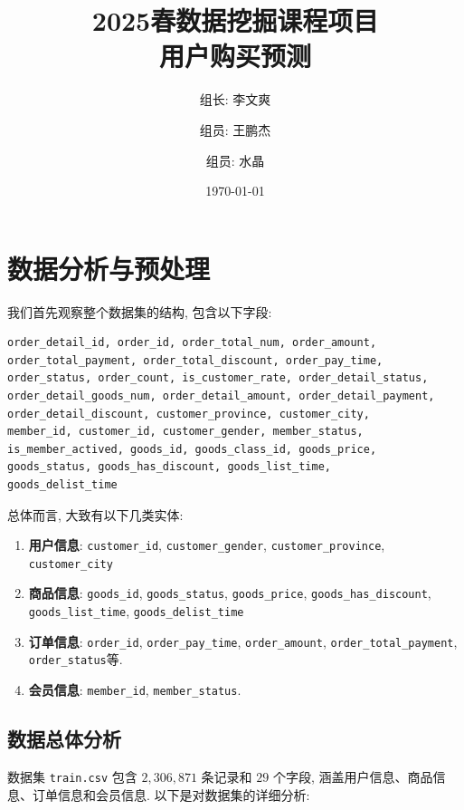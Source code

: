 \documentclass[11pt, a4paper]{article}
\title{2025春数据挖掘课程项目 \\ 用户购买预测}
\author{组长: 李文爽 \and 组员: 王鹏杰 \and 组员: 水晶}
\date{\today}
\begin{document}
\maketitle
\thispagestyle{empty}
\newpage
\tableofcontents
\newpage

\section{数据分析与预处理}

我们首先观察整个数据集的结构, 包含以下字段:
\begin{lstlisting}[language=bash]
order_detail_id, order_id, order_total_num, order_amount, 
order_total_payment, order_total_discount, order_pay_time, 
order_status, order_count, is_customer_rate, order_detail_status, 
order_detail_goods_num, order_detail_amount, order_detail_payment, 
order_detail_discount, customer_province, customer_city, 
member_id, customer_id, customer_gender, member_status, 
is_member_actived, goods_id, goods_class_id, goods_price, 
goods_status, goods_has_discount, goods_list_time, 
goods_delist_time
\end{lstlisting}

总体而言, 大致有以下几类实体:
\begin{enumerate}
    \item \textbf{用户信息}: \texttt{customer\_id}, \texttt{customer\_gender}, \texttt{customer\_province}, \texttt{customer\_city}
    \item \textbf{商品信息}: \texttt{goods\_id}, \texttt{goods\_status}, \texttt{goods\_price}, \texttt{goods\_has\_discount}, \texttt{goods\_list\_time}, \texttt{goods\_delist\_time}
    \item \textbf{订单信息}: \texttt{order\_id}, \texttt{order\_pay\_time}, \texttt{order\_amount}, \texttt{order\_total\_payment}, \texttt{order\_status}等.
    \item \textbf{会员信息}: \texttt{member\_id}, \texttt{member\_status}.
\end{enumerate}

\subsection{数据总体分析}

数据集 \texttt{train.csv} 包含 $2,306,871$ 条记录和 $29$ 个字段, 涵盖用户信息、商品信息、订单信息和会员信息. 以下是对数据集的详细分析:
\end{document}

